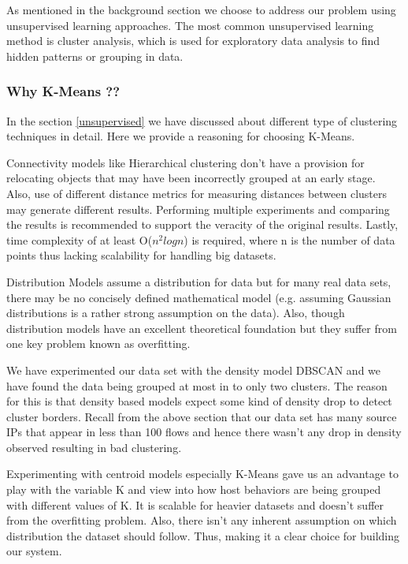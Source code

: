 As mentioned in the background section we choose to address our problem using unsupervised learning approaches. The most common unsupervised learning method is cluster analysis, which is used for exploratory data analysis to find hidden patterns or grouping in data. 

\subsubsection{Why K-Means ??}
 In the section \ref{unsupervised} we have discussed about different type of clustering techniques in detail. Here we provide a reasoning for choosing K-Means.
 
Connectivity models like Hierarchical clustering don't have a provision for relocating objects that may have been incorrectly grouped at an early stage. Also, use of different distance metrics for measuring distances between clusters may generate different results. Performing multiple experiments and comparing
the results is recommended to support the veracity of
the original results. Lastly, time complexity of at least O($n^2logn$) is required, where n is the number of data points thus lacking scalability for handling big datasets.

Distribution Models assume a distribution for data but for many real data sets, there may be no concisely defined mathematical model (e.g. assuming Gaussian distributions is a rather strong assumption on the data). Also, though distribution models have an excellent  theoretical foundation but they suffer from one key problem known as overfitting. 

We have experimented our data set with the density model DBSCAN and we have found the data being grouped at most in to only two clusters. The reason for this is that density based models expect some kind of density drop to detect cluster borders. Recall from the above section that our data set has many source IPs that appear in less than 100 flows and hence there wasn't any drop in density observed resulting in bad clustering.

Experimenting with centroid models especially K-Means gave us an advantage to play with the variable K and view into how host behaviors are being grouped with different values of K. It is scalable for heavier datasets and doesn't suffer from the overfitting problem. Also, there isn't any inherent assumption on which distribution the dataset should follow. Thus, making it a clear choice for building our system.


